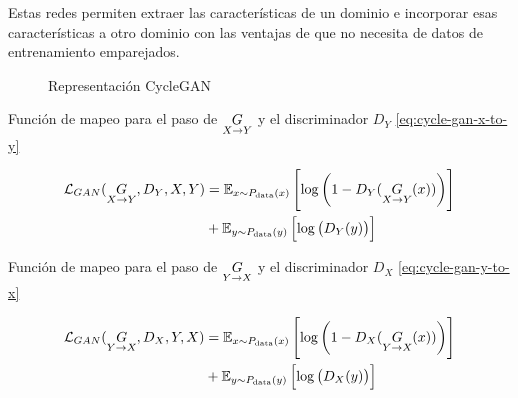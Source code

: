 
Estas redes permiten extraer las características de un dominio e incorporar esas características a otro dominio con las ventajas de que no necesita de datos de entrenamiento emparejados.

\begin{figure}[H]
    \centering
    \caption{Representación CycleGAN}
    \label{fig:fig-cyclegan}
\end{figure}

Función de mapeo para el paso de ${\underset{X\rightarrow{}Y}{G}}$ y el discriminador $D_{Y}$ \ref{eq:cycle-gan-x-to-y}

\begin{equation}
    \begin{split}
        \mathcal{L}_{GAN} (\underset{X\rightarrow{}Y}{G}, D_{Y}, X, Y)
        & = \mathbb{E}_{x\sim{}P_{\text{data}}(x)} \left[\log{\left(1 - D_{Y}(\underset{X\rightarrow{}Y}{G}(x))\right)}\right]     \\
        & + \mathbb{E}_{y\sim{}P_{\text{data}}(y)} \left[\log{\left(D_{Y}(y)\right)}\right]                   \\
    \end{split}
    \label{eq:cycle-gan-x-to-y}
\end{equation}

Función de mapeo para el paso de ${\underset{Y\rightarrow{}X}{G}}$ y el discriminador $D_{X}$ \ref{eq:cycle-gan-y-to-x}

\begin{equation}
    \begin{split}
        \mathcal{L}_{GAN} (\underset{Y\rightarrow{}X}{G}, D_{X}, Y, X)
        & = \mathbb{E}_{x\sim{}P_{\text{data}}(x)} \left[\log{\left(1 - D_{X}(\underset{Y\rightarrow{}X}{G}(x))\right)}    \right]     \\
        & + \mathbb{E}_{y\sim{}P_{\text{data}}(y)} \left[\log{\left(    D_{X}(y)          \right)}    \right]     \\
    \end{split}
    \label{eq:cycle-gan-y-to-x}
\end{equation}

